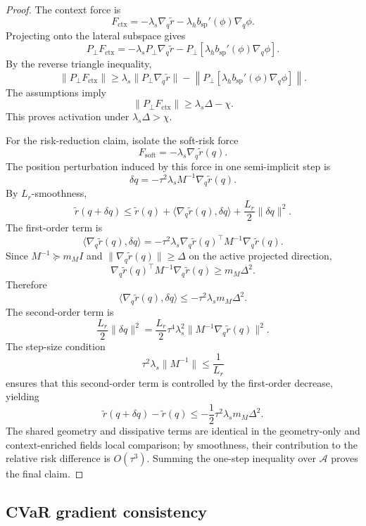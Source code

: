 \begin{proof}
The context force is
\[
    F_{\mathrm{ctx}}
    =
    -\lambda_s\nabla_q\widetilde r
    -
    \lambda_h b_{\mathrm{sp}}'(\phi)\nabla_q\phi .
\]
Projecting onto the lateral subspace gives
\[
    P_\perp F_{\mathrm{ctx}}
    =
    -\lambda_sP_\perp\nabla_q\widetilde r
    -
    P_\perp\!\left[
    \lambda_h b_{\mathrm{sp}}'(\phi)\nabla_q\phi
    \right].
\]
By the reverse triangle inequality,
\[
    \|P_\perp F_{\mathrm{ctx}}\|
    \ge
    \lambda_s\|P_\perp\nabla_q\widetilde r\|
    -
    \left\|
    P_\perp\!\left[
    \lambda_h b_{\mathrm{sp}}'(\phi)\nabla_q\phi
    \right]
    \right\|.
\]
The assumptions imply
\[
    \|P_\perp F_{\mathrm{ctx}}\|\ge \lambda_s\Delta-\chi.
\]
This proves activation under \(\lambda_s\Delta>\chi\).

For the risk-reduction claim, isolate the soft-risk force
\[
    F_{\mathrm{soft}}=-\lambda_s\nabla_q\widetilde r(q).
\]
The position perturbation induced by this force in one semi-implicit step is
\[
    \delta q
    =
    -\tau^2\lambda_sM^{-1}\nabla_q\widetilde r(q).
\]
By \(L_r\)-smoothness,
\[
    \widetilde r(q+\delta q)
    \le
    \widetilde r(q)
    +
    \langle\nabla_q\widetilde r(q),\delta q\rangle
    +
    \frac{L_r}{2}\|\delta q\|^2 .
\]
The first-order term is
\[
    \langle\nabla_q\widetilde r(q),\delta q\rangle
    =
    -\tau^2\lambda_s
    \nabla_q\widetilde r(q)^\top
    M^{-1}
    \nabla_q\widetilde r(q).
\]
Since \(M^{-1}\succeq m_MI\) and
\(\|\nabla_q\widetilde r(q)\|\ge \Delta\) on the active projected direction,
\[
    \nabla_q\widetilde r(q)^\top M^{-1}\nabla_q\widetilde r(q)
    \ge
    m_M\Delta^2.
\]
Therefore
\[
    \langle\nabla_q\widetilde r(q),\delta q\rangle
    \le
    -\tau^2\lambda_s m_M\Delta^2.
\]
The second-order term is
\[
    \frac{L_r}{2}\|\delta q\|^2
    =
    \frac{L_r}{2}
    \tau^4\lambda_s^2
    \|M^{-1}\nabla_q\widetilde r(q)\|^2 .
\]
The step-size condition
\[
    \tau^2\lambda_s\|M^{-1}\|\le \frac{1}{L_r}
\]
ensures that this second-order term is controlled by the first-order decrease, yielding
\[
    \widetilde r(q+\delta q)-\widetilde r(q)
    \le
    -\frac12\tau^2\lambda_s m_M\Delta^2.
\]
The shared geometry and dissipative terms are identical in the geometry-only and context-enriched fields
local comparison; by smoothness, their contribution to the relative risk difference is
\(O(\tau^3)\). Summing the one-step inequality over \(\mathcal A\) proves the final
claim.
\end{proof}

\subsection{CVaR gradient consistency}

